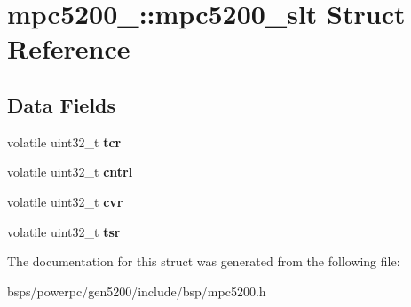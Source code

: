 \hypertarget{structmpc5200___1_1mpc5200__slt}{}\section{mpc5200\+\_\+\+::mpc5200\+\_\+slt Struct Reference}
\label{structmpc5200___1_1mpc5200__slt}
\subsection*{Data Fields}
\begin{DoxyCompactItemize}
\item 
\mbox{\label{structmpc5200___1_1mpc5200__slt_a8676e4430f2f4ef3498a9cafdea9cb53}} 
volatile uint32\+\_\+t {\bfseries tcr}
\item 
\mbox{\label{structmpc5200___1_1mpc5200__slt_aa6475a966d077139bfc86b7e8b71de24}} 
volatile uint32\+\_\+t {\bfseries cntrl}
\item 
\mbox{\label{structmpc5200___1_1mpc5200__slt_aeef9f1f6bcc2e8c1264b4005b964eba6}} 
volatile uint32\+\_\+t {\bfseries cvr}
\item 
\mbox{\label{structmpc5200___1_1mpc5200__slt_a9f19bde91d9eec4a1d9c6249e2003b52}} 
volatile uint32\+\_\+t {\bfseries tsr}
\end{DoxyCompactItemize}


The documentation for this struct was generated from the following file\+:\begin{DoxyCompactItemize}
\item 
bsps/powerpc/gen5200/include/bsp/mpc5200.\+h\end{DoxyCompactItemize}
